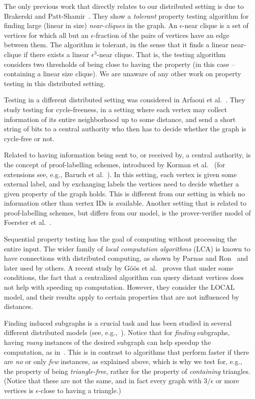 \documentclass[11pt]{article}
\begin{document}
The only previous work that directly relates to our distributed setting is due to Brakerski and Patt-Shamir~\cite{brakerski2011distributed}. They show a \emph{tolerant} property testing algorithm for finding large (linear in size) \emph{near-cliques} in the graph. An $\epsilon$-near clique is a set of vertices for which all but an $\epsilon$-fraction of the pairs of vertices have an edge between them. The algorithm is tolerant, in the sense that it finds a linear near-clique if there exists a linear $\epsilon^3$-near clique. That is, the testing algorithm considers two thresholds of being close to having the property (in this case -- containing a linear size clique). We are unaware of any other work on property testing in this distributed setting.

Testing in a different distributed setting was considered in Arfaoui et al.~\cite{ArfaouiFIM14}. They study testing for cycle-freeness, in a setting where each vertex may collect information of its entire neighborhood up to some distance, and send a short string of bits to a central authority who then has to decide whether the graph is cycle-free or not.


Related to having information being sent to, or received by, a central authority, is the concept of proof-labelling schemes, introduced by Korman et al.~\cite{KormanKP10} (for extensions see, e.g., Baruch et al.~\cite{BaruchFP15}). In this setting, each vertex is given some external label, and by exchanging labels the vertices need to decide whether a given property of the graph holds. This is different from our setting in which no information other than vertex IDs is available. Another setting that is related to proof-labelling schemes, but differs from our model, is the prover-verifier model of Foerster et al.~\cite{FoersterLSW16}.

Sequential property testing has the goal of computing without processing the entire input. The wider family of \emph{local computation algorithms} (LCA) is known to have connections with distributed computing, as shown by Parnas and Ron~\cite{ParnasR07} and later used by others. A recent study by G\"{o}\"{o}s et al.~\cite{goos2015non} proves that under some conditions, the fact that a centralized algorithm can query distant vertices does not help with speeding up computation. However, they consider the LOCAL model, and their results apply to certain properties that are not influenced by distances.

Finding induced subgraphs is a crucial task and has been studied in several different distributed models (see, e.g.,~\cite{KariMRS15,DruckerKO12,Censor-HillelKK15,DolevLP12}). Notice that for \emph{finding} subgraphs, having \emph{many} instances of the desired subgraph can help speedup the computation, as in~\cite{DolevLP12}. This is in contrast to algorithms that perform faster if there are \emph{no} or only \emph{few} instances, as explained above, which is why we test for, e.g., the property of being \emph{triangle-free}, rather for the property of \emph{containing} triangles. (Notice that these are not the same, and in fact every graph with $3/\epsilon$ or more vertices is $\epsilon$-close to having a triangle.)
\end{document}
